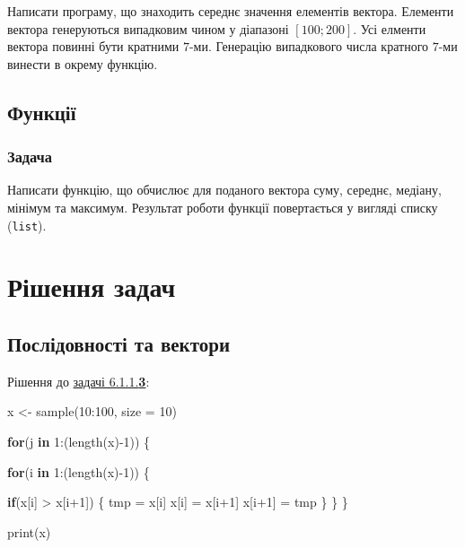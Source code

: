 \documentclass[
]{book}
\newenvironment{Shaded}{\begin{snugshade}}{\end{snugshade}}
\newcommand{\AttributeTok}[1]{\textcolor[rgb]{0.77,0.63,0.00}{#1}}
\newcommand{\ControlFlowTok}[1]{\textcolor[rgb]{0.13,0.29,0.53}{\textbf{#1}}}
\newcommand{\DecValTok}[1]{\textcolor[rgb]{0.00,0.00,0.81}{#1}}
\newcommand{\FunctionTok}[1]{\textcolor[rgb]{0.00,0.00,0.00}{#1}}
\newcommand{\NormalTok}[1]{#1}
\newcommand{\OtherTok}[1]{\textcolor[rgb]{0.56,0.35,0.01}{#1}}
\newcommand{\SpecialCharTok}[1]{\textcolor[rgb]{0.00,0.00,0.00}{#1}}
\begin{document}
Написати програму, що знаходить середнє значення елементів вектора. Елементи вектора генеруються випадковим чином у діапазоні \([100; 200]\). Усі елменти вектора повинні бути кратними \(7\)-ми. Генерацію випадкового числа кратного \(7\)-ми винести в окрему функцію.

\hypertarget{chapter612}{%
\subsection{Функції}\label{chapter612}}

\hypertarget{task6121}{%
\subsubsection{Задача}\label{task6121}}

Написати функцію, що обчислює для поданого вектора суму, середнє, медіану, мінімум та максимум. Результат роботи функції повертається у вигляді списку (\texttt{list}).

\hypertarget{chapter62}{%
\section{Рішення задач}\label{chapter62}}

\hypertarget{chapter621}{%
\subsection{Послідовності та вектори}\label{chapter621}}

Рішення до \protect\hyperlink{task6113}{задачі 6.1.1.\textbf{3}}:

\begin{Shaded}
\begin{Highlighting}[]
\NormalTok{x }\OtherTok{\textless{}{-}} \FunctionTok{sample}\NormalTok{(}\DecValTok{10}\SpecialCharTok{:}\DecValTok{100}\NormalTok{, }\AttributeTok{size =} \DecValTok{10}\NormalTok{)}
  
\ControlFlowTok{for}\NormalTok{(j }\ControlFlowTok{in} \DecValTok{1}\SpecialCharTok{:}\NormalTok{(}\FunctionTok{length}\NormalTok{(x)}\SpecialCharTok{{-}}\DecValTok{1}\NormalTok{)) \{}
  
  \ControlFlowTok{for}\NormalTok{(i }\ControlFlowTok{in} \DecValTok{1}\SpecialCharTok{:}\NormalTok{(}\FunctionTok{length}\NormalTok{(x)}\SpecialCharTok{{-}}\DecValTok{1}\NormalTok{)) \{}
    
    \ControlFlowTok{if}\NormalTok{(x[i] }\SpecialCharTok{\textgreater{}}\NormalTok{ x[i}\SpecialCharTok{+}\DecValTok{1}\NormalTok{]) \{}
\NormalTok{      tmp }\OtherTok{=}\NormalTok{ x[i]}
\NormalTok{      x[i] }\OtherTok{=}\NormalTok{ x[i}\SpecialCharTok{+}\DecValTok{1}\NormalTok{]}
\NormalTok{      x[i}\SpecialCharTok{+}\DecValTok{1}\NormalTok{] }\OtherTok{=}\NormalTok{ tmp}
\NormalTok{    \}}
\NormalTok{  \}}
\NormalTok{\}}

\FunctionTok{print}\NormalTok{(x)}
\end{Highlighting}
\end{Shaded}
\end{document}
